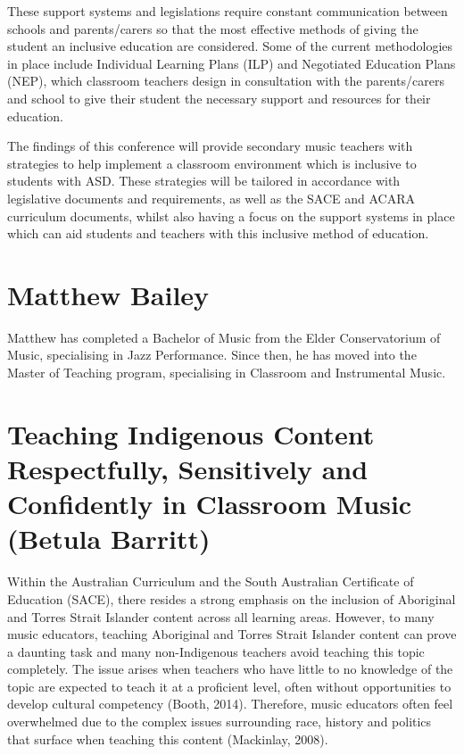 \documentclass[twoside,12pt,a4paper,notitlepage]{memoir}
\begin{document}
These support systems and legislations require constant communication between schools and parents/carers so that the most effective methods of giving the student an inclusive education are considered. Some of the current methodologies in place include Individual Learning Plans (ILP) and Negotiated Education Plans (NEP), which classroom teachers design in consultation with the parents/carers and school to give their student the necessary support and resources for their education.

The findings of this conference will provide secondary music teachers with strategies to help implement a classroom environment which is inclusive to students with ASD. These strategies will be tailored in accordance with legislative documents and requirements, as well as the SACE and ACARA curriculum documents, whilst also having a focus on the support systems in place which can aid students and teachers with this inclusive method of education.

\section*{Matthew Bailey}

Matthew has completed a Bachelor of Music from the Elder Conservatorium of Music, specialising in Jazz Performance. Since then, he has moved into the Master of Teaching program, specialising in Classroom and Instrumental Music.


\pagebreak
\section*{Teaching Indigenous Content Respectfully, Sensitively and Confidently in Classroom Music (Betula Barritt)}
\label{aut:barritt}

Within the Australian Curriculum and the South Australian Certificate of Education (SACE), there resides a strong emphasis on the inclusion of Aboriginal and Torres Strait Islander content across all learning areas. However, to many music educators, teaching Aboriginal and Torres Strait Islander content can prove a daunting task and many non-Indigenous teachers avoid teaching this topic completely. The issue arises when teachers who have little to no knowledge of the topic are expected to teach it at a proficient level, often without opportunities to develop cultural competency (Booth, 2014). Therefore, music educators often feel overwhelmed due to the complex issues surrounding race, history and politics that surface when teaching this content (Mackinlay, 2008).
\end{document}

